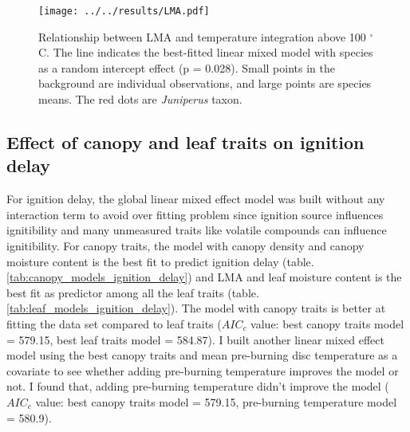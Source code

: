 \documentclass[12pt]{report}
\begin{document}
\begin{figure}
    \centering
    \texttt{[image: ../../results/LMA.pdf]}
    \caption[short version]{\label{fig:LMA-tempint} Relationship between LMA and temperature integration above 100 $^{\circ}$C. The line indicates the best-fitted linear mixed model with species as a random intercept effect (p = 0.028). Small points in the background are individual observations, and large points are species means. The red dots are \emph{Juniperus} taxon.}
\end{figure}





\subsection{Effect of canopy and leaf traits on ignition delay}



For ignition delay, the global linear mixed effect model was built without any interaction term  to avoid over fitting problem since ignition source influences ignitibility \citep{madrigal2012evaluation} and many unmeasured traits like volatile compounds can influence ignitibility. For canopy traits, the model with canopy density and canopy moisture content is the best fit to predict ignition delay (table. \ref{tab:canopy_models_ignition_delay}) and LMA and leaf moisture content is the best fit as predictor among all the leaf traits (table. \ref{tab:leaf_models_ignition_delay}). The model with canopy traits is better at fitting the data set compared to leaf traits ($AIC_{c}$ value: best canopy traits model = 579.15, best leaf traits model = 584.87). I built another linear mixed effect model using the best canopy traits and  mean pre-burning disc temperature as a covariate to see whether adding pre-burning temperature improves the model or not. I found that, adding pre-burning temperature didn't improve the model ($AIC_{c}$ value: best canopy traits model = 579.15, pre-burning temperature model = 580.9).
\end{document}
